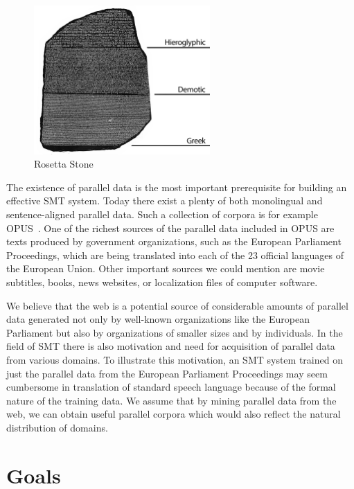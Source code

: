 \begin{figure}[!htb]
	\centering
	\caption{Rosetta Stone}
	\label{figure:rosetta_stone}
	\vspace{1em}
	\includegraphics[width=0.6\textwidth]{images/rosetta_stone.png}
\end{figure}

The existence of parallel data is the most important prerequisite for building an effective SMT system. Today there exist a plenty of both monolingual and sentence-aligned parallel data. Such a collection of corpora is for example OPUS~\cite{Tiedemann12}. One of the richest sources of the parallel data included in OPUS are texts produced by government organizations, such as the European Parliament Proceedings, which are being translated into each of the 23 official languages of the European Union. Other important sources we could mention are movie subtitles, books, news websites, or localization files of computer software. 

We believe that the web is a potential source of considerable amounts of parallel data generated not only by well-known organizations like the European Parliament but also by organizations of smaller sizes and by individuals. In the field of SMT there is also motivation and need for acquisition of parallel data from various domains. To illustrate this motivation, an SMT system trained on just the parallel data from the European Parliament Proceedings may seem cumbersome in translation of standard speech language because of the formal nature of the training data. We assume that by mining parallel data from the web, we can obtain useful parallel corpora which would also reflect the natural distribution of domains.

\section*{Goals}

